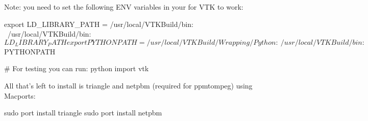 Note: you need to set the following ENV variables in your  for VTK to work:
\begin{shellCode}
export LD_LIBRARY_PATH = /usr/local/VTKBuild/bin: \
             /usr/local/VTKBuild/bin:${LD_LIBRARY_PATH}
export PYTHONPATH = /usr/local/VTKBuild/Wrapping/Python:\ 
            /usr/local/VTKBuild/bin:${PYTHONPATH}
     
#     For testing you can run:
python
import vtk
\end{shellCode}
 
All that's left to install is triangle and netpbm (required for ppmtompeg) using Macports:
\begin{shellCode}
sudo port install triangle
sudo port install netpbm
\end{shellCode}


